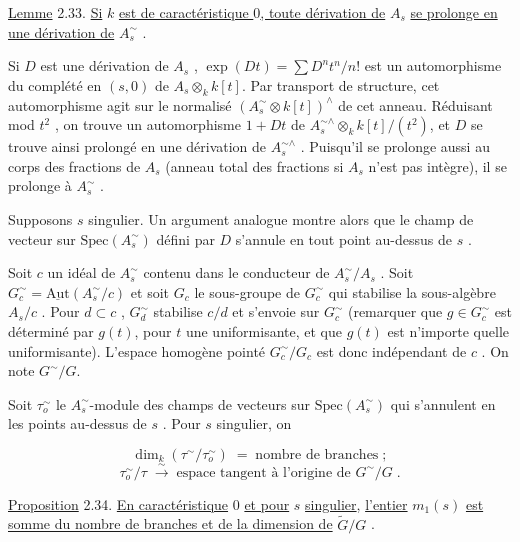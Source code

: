 
\underline{Lemme} 2.33. \underline{Si} $k$ \underline{est de caractéristique $0$, toute dérivation de} $A_s$ \underline{se prolonge en une dérivation de} $A_s^{\sim}$ .

Si $D$ est une dérivation de $A_s$ , $\exp(Dt) = \sum D^n t^n/n!$ est un automorphisme du complété en $(s,0)$ de $A_s \otimes_k k[t]$. Par transport de structure, cet automorphisme agit sur le normalisé $(A_s^{\sim} \otimes k[t])^{\wedge}$ de cet anneau. Réduisant mod $t^2$ , on trouve un automorphisme $1 + Dt$ de $A_s^{\sim\wedge} \otimes_k k[t]/(t^2)$, et $D$ se trouve ainsi prolongé en une dérivation de $A_s^{\sim\wedge}$ . Puisqu'il se prolonge aussi au corps des fractions de $A_s$ (anneau total des fractions si $A_s$ n'est pas intègre), il se prolonge à $A_s^{\sim}$ .

Supposons $s$ singulier. Un argument analogue montre alors que le champ de vecteur sur $\mathrm{Spec}(A_s^{\sim})$ défini par $D$ s'annule en tout point au-dessus de $s$ .

Soit $c$ un idéal de $A_s^{\sim}$ contenu dans le conducteur de $A_s^{\sim}/A_s$ . Soit $G_c^{\sim} = \underline{\mathrm{Aut}}(A_s^{\sim}/c)$ et soit $G_c$ le sous-groupe de $G_c^{\sim}$ qui stabilise la sous-algèbre $A_s/c$ . Pour $d \subset c$ , $G_d^{\sim}$ stabilise $c/d$ et s'envoie sur $G_c^{\sim}$ (remarquer que $g \in G_c^{\sim}$ est déterminé par $g(t)$, pour $t$ une uniformisante, et que $g(t)$ est n'importe quelle uniformisante). L'espace homogène pointé $G_c^{\sim}/G_c$ est donc indépendant de $c$ . On note $G^{\sim}/G$.

Soit $\tau_o^{\sim}$ le $A_s^{\sim}$-module des champs de vecteurs sur $\mathrm{Spec}(A_s^{\sim})$ qui s'annulent en les points au-dessus de $s$ . Pour $s$ singulier, on

\begin{equation*}
\dim_k(\tau^{\sim}/\tau_o^{\sim}) \;=\; \mbox{nombre de branches} \;;
\end{equation*}
\begin{equation*}
\tau_o^{\sim}/\tau \;\stackrel{\sim}{\longrightarrow}\; \mbox{espace tangent à l'origine de } G^{\sim}/G \;.
\end{equation*}


\underline{Proposition} 2.34. \underline{En caractéristique} $0$ \underline{et pour} $s$ \underline{singulier}, \underline{l'entier} $m_1(s)$ \underline{est somme du nombre de branches et de la dimension de} $\widetilde{G}/G$ .


